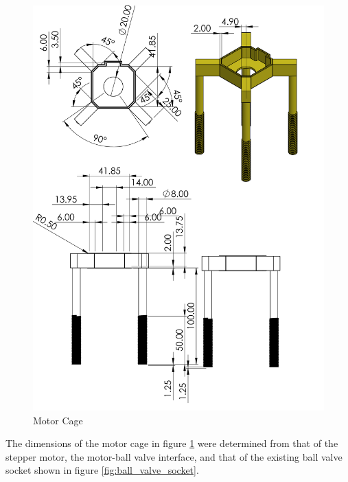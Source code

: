 \begin{enumerate}
\begin{enumerate}
    \begin{figure}[H]
        \centering
        \includegraphics[height=.75\textheight]{Figures/MotorCage.PNG}
        \caption{Motor Cage}
        \label{fig:motor_cage_stepper}
    \end{figure}
    
    The dimensions of the motor cage in figure \ref{fig:motor_cage_stepper} were determined from that of the stepper motor, the motor-ball valve interface, and that of the existing ball valve socket shown in figure \ref{fig:ball_valve_socket}.
    

\end{enumerate}
\end{enumerate}
